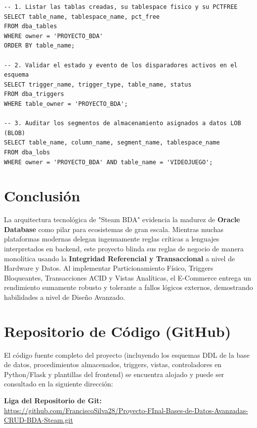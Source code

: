 \documentclass[12pt,a4paper]{article}
\begin{document}
\begin{lstlisting}[caption=Consultas de Auditoria de DBA]
-- 1. Listar las tablas creadas, su tablespace fisico y su PCTFREE
SELECT table_name, tablespace_name, pct_free 
FROM dba_tables 
WHERE owner = 'PROYECTO_BDA' 
ORDER BY table_name;

-- 2. Validar el estado y evento de los disparadores activos en el esquema
SELECT trigger_name, trigger_type, table_name, status 
FROM dba_triggers 
WHERE table_owner = 'PROYECTO_BDA';

-- 3. Auditar los segmentos de almacenamiento asignados a datos LOB (BLOB)
SELECT table_name, column_name, segment_name, tablespace_name 
FROM dba_lobs 
WHERE owner = 'PROYECTO_BDA' AND table_name = 'VIDEOJUEGO';
\end{lstlisting}

\section{Conclusión}
La arquitectura tecnológica de "Steam BDA" evidencia la madurez de \textbf{Oracle Database} como pilar para ecosistemas de gran escala. Mientras muchas plataformas modernas delegan ingenuamente reglas críticas a lenguajes interpretados en backend, este proyecto blinda sus reglas de negocio de manera monolítica usando la \textbf{Integridad Referencial y Transaccional} a nivel de Hardware y Datos. Al implementar Particionamiento Físico, Triggers Bloqueantes, Transacciones ACID y Vistas Analíticas, el E-Commerce entrega un rendimiento sumamente robusto y tolerante a fallos lógicos externos, demostrando habilidades a nivel de Diseño Avanzado.

\section{Repositorio de Código (GitHub)}
El código fuente completo del proyecto (incluyendo los esquemas DDL de la base de datos, procedimientos almacenados, triggers, vistas, controladores en Python/Flask y plantillas del frontend) se encuentra alojado y puede ser consultado en la siguiente dirección:

\begin{center}
    \colorbox{backcolour}{
        \parbox{0.95\textwidth}{
            \centering \vspace{0.3cm}
            \textbf{Liga del Repositorio de Git:} \\
            \url{https://github.com/FranciscoSilva28/Proyecto-FInal-Bases-de-Datos-Avanzadas-CRUD-BDA-Steam.git}
            \vspace{0.3cm}
        }
    }
\end{center}
\end{document}
